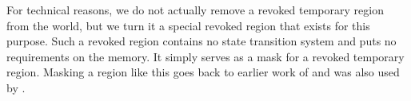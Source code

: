 \documentclass[compsoc,conference,letterpaper,fleqn]{IEEEtran}
\begin{document}
For technical reasons, we do not actually remove a revoked temporary region from
the world, but we turn it a special revoked region that exists for this purpose.
Such a revoked region contains no state transition system and puts no
requirements on the memory. It simply serves as a mask for a revoked temporary
region. Masking a region like this goes back to earlier work of
\citet{Ahmed2004semantics} and was also used by
\citet{Thamsborg:2011:KLR:2034773.2034831}.

\end{document}
